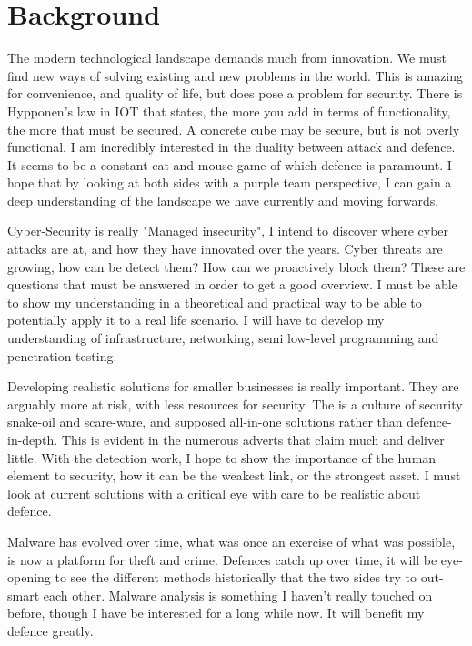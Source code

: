 
\section{Background}
The modern technological landscape demands much from innovation. 
We must find new ways of solving existing and new problems in the world. 
This is amazing for convenience, and quality of life, but does pose a problem for security. 
There is Hypponen's law in IOT that states, the more you add in terms of functionality, the more that must be secured. \citep{hypponen}
A concrete cube may be secure, but is not overly functional. I am incredibly interested in the duality between attack and defence. 
It seems to be a constant cat and mouse game of which defence is paramount. \citep{cutandmouse}
I hope that by looking at both sides with a purple team perspective, I can gain a deep understanding of the landscape we have currently and moving forwards. 

Cyber-Security is really "Managed insecurity", I intend to discover where cyber attacks are at, and how they have innovated over the years.
Cyber threats are growing, how can be detect them? How can we proactively block them? These are questions that must be answered in order to get a good overview.
I must be able to show my understanding in a theoretical and practical way to be able to potentially apply it to a real life scenario. 
I will have to develop my understanding of infrastructure, networking, semi low-level programming and penetration testing.

Developing realistic solutions for smaller businesses is really important. They are arguably more at risk, with less resources for security. \citep{sme}
The is a culture of security snake-oil and scare-ware, and supposed all-in-one solutions rather than defence-in-depth. This is evident in the numerous adverts that claim much and deliver little. \citep{SnakeOil}
With the detection work, I hope to show the importance of the human element to security, how it can be the weakest link, or the strongest asset.  \citep{humanFactor}
I must look at current solutions with a critical eye with care to be realistic about defence. 

Malware has evolved over time, what was once an exercise of what was possible, is now a platform for theft and crime. \citep{malwareHistory}
Defences catch up over time, it will be eye-opening to see the different methods historically that the two sides try to out-smart each other. \citep{malwareHistory}
Malware analysis is something I haven't really touched on before, though I have be interested for a long while now. It will benefit my defence greatly.


